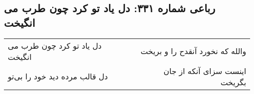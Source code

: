 \begin{center}
\section*{رباعی شماره ۳۳۱: دل یاد تو کرد چون طرب می انگیخت}
\label{sec:0331}
\begin{longtable}{l p{0.5cm} r}
دل یاد تو کرد چون طرب می انگیخت
&&
والله که نخورد آنقدح را و بریخت
\\
دل قالب مرده دید خود را بی‌تو
&&
اینست سزای آنکه از جان بگریخت
\\
\end{longtable}
\end{center}
